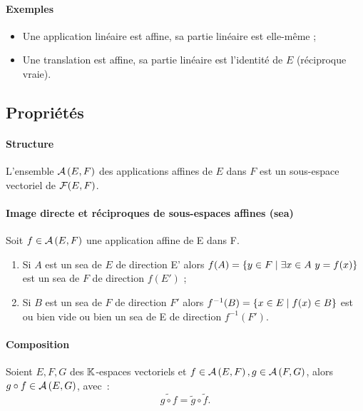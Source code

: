 \paragraph{Exemples}
\begin{itemize}
    \item Une application linéaire est affine, sa partie linéaire est elle-même ;
    \item Une translation est affine, sa partie linéaire est l'identité de $E$
        (réciproque vraie).
\end{itemize}
\subsection{Propriétés}
\label{subsec-chap0:Prop2}
\paragraph{Structure}
\begin{prop}
    L'ensemble $\mathcal{A}\left(E,F\right)$ des applications affines de $E$ dans $F$ est un
    sous-espace vectoriel de $\mathcal{F}(E,F)$.
\end{prop}
\paragraph{Image directe et réciproques de sous-espaces affines (sea)}
\begin{prop}
	Soit $f \in \mathcal{A}\left(E,F\right)$ une application affine de E dans F.
	\begin{enumerate}
		\item Si $A$ est un sea de $E$ de direction E' alors $f(A) = \left\{y \in F\mathrel{}\middle|\mathrel{}\exists x \in A \ y= f(x)\right\}$ est un sea de $F$ de direction $f(E')$ ;
		\item Si $B$ est un sea de $F$ de direction $F'$ alors $f^{-1}(B) = \left\{x \in E\mathrel{}\middle|\mathrel{}f(x) \in B\right\}$ est ou bien vide ou bien un sea de E de direction $f^{-1}(F')$.
	\end{enumerate}
\end{prop}
\paragraph{Composition}
\begin{prop}
	Soient $E, F, G$ des $\mathbb{K}$-espaces vectoriels et $f \in \mathcal{A}\left(E,F\right), g \in \mathcal{A}\left(F,G\right)$, alors $g \circ f \in \mathcal{A}\left(E,G\right)$, avec~:
	\begin{equation}
		\widetilde{g \circ f} = \tilde{g} \circ \tilde{f}.
	\end{equation}
\end{prop}
